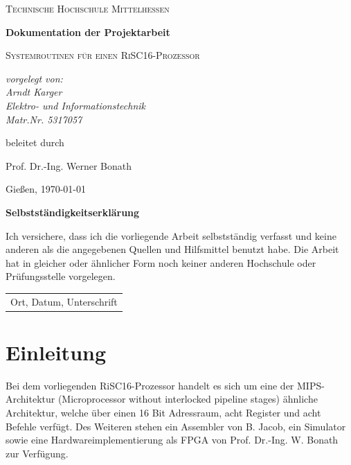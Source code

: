 \documentclass[fleqn, a4paper, 11pt]{article}       %
\begin{document}
\begin{titlepage}
	\centering
	{\scshape\LARGE Technische Hochschule Mittelhessen \par}
	\vspace{1cm}
	{\huge\bfseries Dokumentation der Projektarbeit \par}
	\vspace{1.5cm}
	{\scshape\Large Systemroutinen für einen RiSC16-Prozessor \par}
	\vspace{2cm}
	{\Large\itshape vorgelegt von: \\ Arndt Karger \\ Elektro-  und Informationstechnik\\ Matr.Nr. 5317057\par}
	\vfill
	beleitet durch\par
    Prof. Dr.-Ing. Werner Bonath
	\vfill

	{\large Gießen, \today\par}
\end{titlepage}

\thispagestyle{empty}
{\huge\bfseries Selbstständigkeitserklärung \par}
\vspace{1cm}

\noindent Ich versichere, dass ich die vorliegende Arbeit selbstständig verfasst und keine anderen als die angegebenen
Quellen und Hilfsmittel benutzt habe. Die Arbeit hat in gleicher oder ähnlicher Form noch keiner anderen
Hochschule oder Prüfungsstelle vorgelegen.

\vspace{4cm}
\begin{flushleft}
\begin{tabular}{@{}l@{}}\hline
Ort, Datum, Unterschrift
\end{tabular}
\end{flushleft}

\newpage
\thispagestyle{empty}
\tableofcontents
\newpage
\setcounter{page}{1}

\section{Einleitung}
Bei dem vorliegenden RiSC16-Prozessor handelt es sich um eine der MIPS-Architektur (Microprocessor without interlocked pipeline stages) \cite{MIPS} ähnliche Architektur, welche über einen 16 Bit Adressraum, acht Register und acht Befehle verfügt. Des Weiteren stehen ein Assembler von B. Jacob, ein Simulator sowie eine Hardwareimplementierung als FPGA von Prof. Dr.-Ing. W. Bonath zur Verfügung. 
\end{document}
